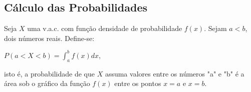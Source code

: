 \documentclass[11pt]{article}
\begin{document}
\subsection{Cálculo das Probabilidades}
Seja $X$ uma v.a.c. com função densidade de probabilidade $f(x)$. Sejam $a < b$, dois números reais. Define-se:
\begin{center}
    $P(a < X < b) = \displaystyle\int_a^b f(x) dx$,
\end{center}
isto é, a probabilidade de que $X$ assuma valores entre os números "a" e "b" é a área sob o gráfico da função $f(x)$ entre os pontos $x=a$ e $x=b$. \\ \\ \\
\end{document}
